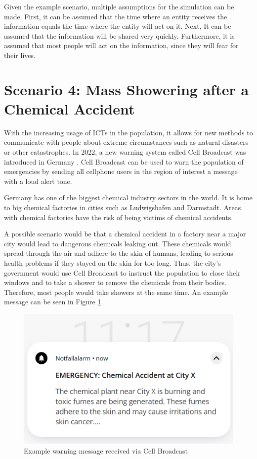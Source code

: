Given the example scenario, multiple assumptions for the simulation can
be made. First, it can be assumed that the time where an entity receives
the information equals the time where the entity will act on it.
Next, It can be assumed that the information will be shared very quickly.
Furthermore, it is assumed that most people will act on the information,
since they will fear for their lives.


\section{Scenario 4: Mass Showering after a Chemical Accident}

With the increasing usage of ICTs in the population, it allows for 
new methods to communicate with people about extreme circumstances
such as natural disasters or other catastrophes. In 2022,
a new warning system called Cell Broadcast was introduced in Germany
\cite{techrichtlinie}. Cell Broadcast can be used to warn the population
of emergencies by sending all cellphone users in the 
region of interest a message with a loud alert tone.

Germany has one of the biggest chemical industry sectors in the world.
It is home to big chemical factories in cities such as Ludwigshafen and
Darmstadt. Areas with chemical factories have the risk of being
victims of chemical accidents.

A possible scenario would be that a chemical accident in a 
factory near a major city would lead to dangerous chemicals 
leaking out. These chemicals would spread through the air 
and adhere to the skin of humans, leading to serious 
health problems if they stayed on the skin for too long.
Thus, the city's government would use Cell Broadcast to
instruct the population to close their windows and 
to take a shower to remove the chemicals from their bodies.
Therefore, most people would take showers at the same time.
An example message can be seen in Figure \ref{warningmessage}.

\begin{figure}[!ht]
    \center
    \includegraphics[scale=.7]{figs/emergencychemical.png}
    \caption{Example warning message received via Cell Broadcast}
    \label{warningmessage}
\end{figure}

